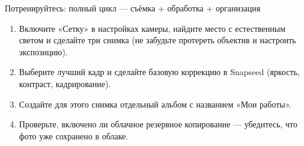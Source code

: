 \begin{tcbpractice}{Потренируйтесь: полный цикл — съёмка + обработка + организация}
\begin{enumerate}
  \item Включите «Сетку» в настройках камеры, найдите место с естественным светом и сделайте три снимка (не забудьте протереть объектив и настроить экспозицию).
  \item Выберите лучший кадр и сделайте базовую коррекцию в Snapseed (яркость, контраст, кадрирование).
  \item Создайте для этого снимка отдельный альбом с названием «Мои работы».
  \item Проверьте, включено ли облачное резервное копирование — убедитесь, что фото уже сохранено в облаке.
\end{enumerate}

\end{tcbpractice}
